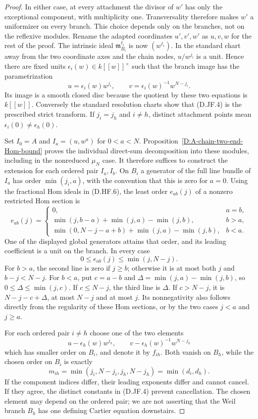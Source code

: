 \begin{proof}
In either case, at every attachment the divisor of $w'$ has only
the exceptional component, with multiplicity one. Transversality
therefore makes $w'$ a uniformizer on every branch. This choice
depends only on the branches, not on the reflexive modules.
Rename the adapted coordinates $u',v',w'$ as $u,v,w$ for the
rest of the proof. The intrinsic ideal
$\mathfrak m_{B_i}^{\ell_i}$ is now $(w^{\ell_i})$.
In the standard chart away from the two coordinate axes and the
chain nodes, $u/w^{j_i}$ is a unit. Hence there are fixed units
$\epsilon_i(w)\in k[[w]]^\times$ such that the branch image has
the parametrization
\[
 u=\epsilon_i(w)w^{j_i},\qquad
 v=\epsilon_i(w)^{-1}w^{N-j_i}.                          \tag{D.JF.4}
\]
Its image is a smooth closed disc because the quotient by these
two equations is $k[[w]]$.  Conversely the standard resolution
charts show that (D.JF.4) is the prescribed strict transform.
If $j_i=j_h$ and $i\ne h$, distinct attachment points mean
$\epsilon_i(0)\ne\epsilon_h(0)$.

Set $I_0=A$ and $I_a=(u,w^a)$ for $0<a<N$.
Proposition~\ref{D:A-chain-two-end-Hom-bound} proves the
individual direct-sum decomposition into these modules, including
in the nonreduced $\mu_N$ case.  It therefore suffices to construct
the extension for each ordered pair $I_a,I_b$.
On $B_i$ a generator of the full line bundle of $I_a$ has order
$\min(j_i,a)$, with the convention that this is zero for $a=0$.
Using the fractional Hom ideals in (D.HF.6), the least order
$e_{ab}(j)$ of a nonzero restricted Hom section is
\[
 e_{ab}(j)=
 \begin{cases}
 0,&a=b,\\
 \min(j,b-a)+\min(j,a)-\min(j,b),&b>a,\\
 \min(0,N-j-a+b)+\min(j,a)-\min(j,b),&b<a.
 \end{cases}                                           \tag{D.JF.5}
\]
One of the displayed global generators attains that order, and
its leading coefficient is a unit on the branch.
In every case
\[
                  0\le e_{ab}(j)\le\min(j,N-j).          \tag{D.JF.6}
\]
For $b>a$, the second line is zero if $j\ge b$; otherwise
it is at most both $j$ and $b-j<N-j$.
For $b<a$, put $c=a-b$ and
$\Delta=\min(j,a)-\min(j,b)$, so $0\le\Delta\le\min(j,c)$.
If $c\le N-j$, the third line is $\Delta$.
If $c>N-j$, it is $N-j-c+\Delta$, at most $N-j$ and at
most $j$.  Its nonnegativity also follows directly from the
regularity of these Hom sections, or by the two cases $j<a$
and $j\ge a$.

For each ordered pair $i\ne h$ choose one of the two elements
\[
 u-\epsilon_h(w)w^{j_h},\qquad
 v-\epsilon_h(w)^{-1}w^{N-j_h}                         \tag{D.JF.7}
\]
which has smaller order on $B_i$, and denote it by $f_{ih}$.
Both vanish on $B_h$, while the chosen order on $B_i$ is
exactly
\[
       m_{ih}=\min(j_i,N-j_i,j_h,N-j_h)=\min(d_i,d_h).
                                                        \tag{D.JF.8}
\]
If the component indices differ, their leading exponents differ
and cannot cancel.  If they agree, the distinct constants in
(D.JF.4) prevent cancellation.  The chosen element may depend
on the ordered pair; we are not asserting that the Weil branch
$B_h$ has one defining Cartier equation downstairs.


\end{proof}
